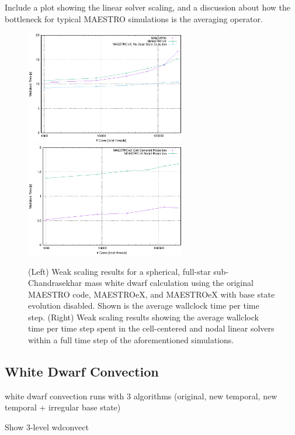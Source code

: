 Include a plot showing the linear solver scaling, and a discussion about how the bottleneck for typical MAESTRO simulations is the averaging operator.



\begin{figure}[htb]
\begin{center}
\includegraphics[width=2.75in]{./figs/MAESTRO_scaling1}
\includegraphics[width=2.75in]{./figs/MAESTRO_scaling2}
\caption{\label{fig:scaling} (Left) Weak scaling results for a spherical, full-star sub-Chandrasekhar mass white dwarf calculation using the original MAESTRO code, MAESTROeX, and MAESTROeX with base state evolution disabled.  Shown is the average wallclock time per time step.
(Right) Weak scaling results showing the average wallclock time per time step spent in the cell-centered and nodal linear solvers within a full time step of the aforementioned simulations.}
\end{center}
\end{figure}

\subsection{White Dwarf Convection}
white dwarf convection runs with 3 algorithms (original, new temporal, new temporal + irregular base state)

Show 3-level wdconvect
